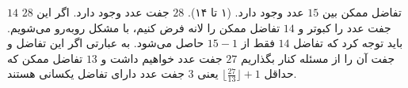 \p
$14$
تفاضل ممکن بین
$15$
عدد وجود دارد. (۱ تا ۱۴).
$28$
جفت عدد وجود دارد. اگر این
$28$
جفت عدد را کبوتر و
$14$
تفاضل ممکن را لانه فرض کنیم، با مشکل روبه‌رو می‌شویم. باید توجه کرد که تفاضل
$14$
فقط از
$15-1$
حاصل می‌شود. به عبارتی اگر این تفاضل و جفت آن را از مسئله کنار بگذاریم
$27$
جفت عدد خواهیم داشت و
$13$
تفاضل ممکن که حداقل
$\lfloor{\frac{27}{13}}\rfloor + 1$
یعنی
$3$
جفت عدد دارای تفاضل یکسانی هستند.

